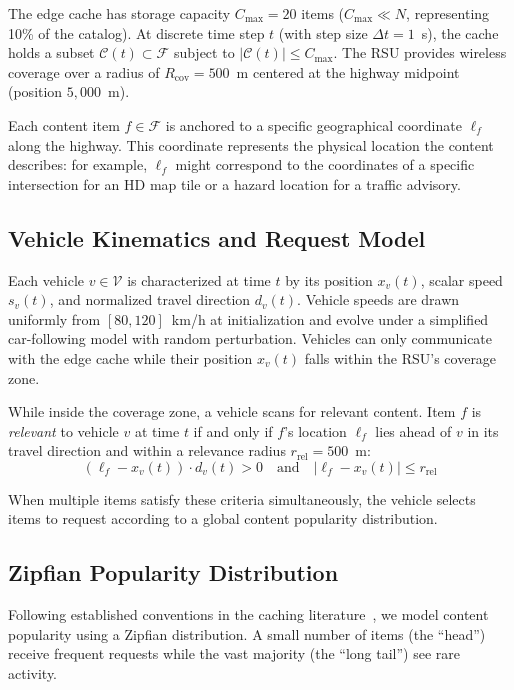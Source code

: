 \documentclass[preprint,12pt]{elsarticle}
\begin{document}
	The edge cache has storage capacity $C_\text{max} = 20$ items ($C_\text{max} \ll N$, representing 10\% of the catalog). At discrete time step $t$ (with step size $\Delta t = 1$~s), the cache holds a subset $\mathcal{C}(t) \subset \mathcal{F}$ subject to $|\mathcal{C}(t)| \leq C_\text{max}$. The RSU provides wireless coverage over a radius of $R_\text{cov} = 500$~m centered at the highway midpoint (position $5{,}000$~m).
	
	Each content item $f \in \mathcal{F}$ is anchored to a specific geographical coordinate $\ell_f$ along the highway. This coordinate represents the physical location the content describes: for example, $\ell_f$ might correspond to the coordinates of a specific intersection for an HD map tile or a hazard location for a traffic advisory.
	
	\subsection{Vehicle Kinematics and Request Model}
	
	Each vehicle $v \in \mathcal{V}$ is characterized at time $t$ by its position $x_v(t)$, scalar speed $s_v(t)$, and normalized travel direction $d_v(t)$. Vehicle speeds are drawn uniformly from $[80, 120]$~km/h at initialization and evolve under a simplified car-following model with random perturbation. Vehicles can only communicate with the edge cache while their position $x_v(t)$ falls within the RSU's coverage zone.
	
	While inside the coverage zone, a vehicle scans for relevant content. Item $f$ is \emph{relevant} to vehicle $v$ at time $t$ if and only if $f$'s location $\ell_f$ lies ahead of $v$ in its travel direction and within a relevance radius $r_\text{rel} = 500$~m:
	\begin{equation}
		(\ell_f - x_v(t)) \cdot d_v(t) > 0 \quad \text{and} \quad |\ell_f - x_v(t)| \leq r_\text{rel}
		\label{eq:relevance}
	\end{equation}
	
	When multiple items satisfy these criteria simultaneously, the vehicle selects items to request according to a global content popularity distribution.
	
	\subsection{Zipfian Popularity Distribution}
	
	Following established conventions in the caching literature~\cite{breslau1999web}, we model content popularity using a Zipfian distribution. A small number of items (the ``head'') receive frequent requests while the vast majority (the ``long tail'') see rare activity.
	
\end{document}
